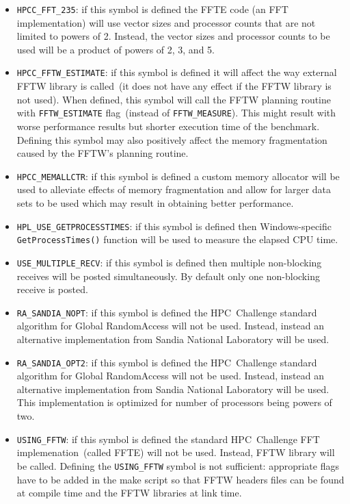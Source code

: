 \documentclass[twocolumn]{article}
\begin{document}
\begin{itemize}
\item \texttt{HPCC\_FFT\_235}: if this symbol is defined the FFTE
code (an FFT implementation) will use vector sizes and processor
counts that are not limited to powers of 2. Instead, the vector sizes
and processor counts to be used will be a product of powers of 2, 3,
and 5.
\item \texttt{HPCC\_FFTW\_ESTIMATE}: if this symbol is defined it will
affect the way external FFTW library is called~(it does not have any
effect if the FFTW library is not used). When defined, this symbol
will call the FFTW planning routine with \texttt{FFTW\_ESTIMATE}
flag~(instead of \texttt{FFTW\_MEASURE}). This might result with worse
performance results but shorter execution time of the
benchmark. Defining this symbol may also positively affect the memory
fragmentation caused by the FFTW's planning routine.
\item \texttt{HPCC\_MEMALLCTR}: if this symbol is defined a custom
memory allocator will be used to alleviate effects of memory
fragmentation and allow for larger data sets to be used which may
result in obtaining better performance.
\item \texttt{HPL\_USE\_GETPROCESSTIMES}: if this symbol is defined
then Windows-specific \texttt{GetProcessTimes()} function will be used
to measure the elapsed CPU time.
\item \texttt{USE\_MULTIPLE\_RECV}: if this symbol is defined then multiple non-blocking
receives will be posted simultaneously. By default only one non-blocking
receive is posted.
\item \texttt{RA\_SANDIA\_NOPT}: if this symbol is defined the
HPC~Challenge standard algorithm for Global RandomAccess will not be
used. Instead, instead an alternative implementation from Sandia
National Laboratory will be used.
\item \texttt{RA\_SANDIA\_OPT2}: if this symbol is defined the
HPC~Challenge standard algorithm for Global RandomAccess will not be
used. Instead, instead an alternative implementation from Sandia
National Laboratory will be used. This implementation is optimized for
number of processors being powers of two.
\item \texttt{USING\_FFTW}: if this symbol is defined the standard
HPC~Challenge FFT implemenation~(called FFTE) will not be used.
Instead, FFTW library will be called. Defining the
\texttt{USING\_FFTW} symbol is not sufficient: appropriate flags have
to be added in the make script so that FFTW headers files can be found
at compile time and the FFTW libraries at link time.
\end{itemize}
\end{document}
